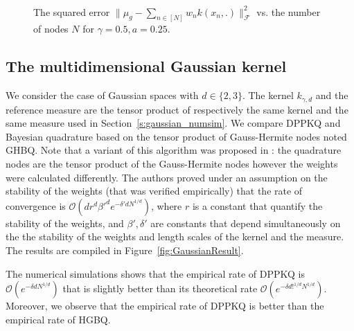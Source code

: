 \documentclass[twoside,11pt]{book}
\numberwithin{theorem}{chapter}
\numberwithin{definition}{chapter}
\numberwithin{proposition}{chapter}
\numberwithin{corollary}{chapter}
\numberwithin{example}{chapter}
\numberwithin{lemma}{chapter}
\numberwithin{assumption}{chapter}
\begin{document}
\begin{figure}
\\
\caption{The squared error $\|\mu_{g}-\sum\limits_{n \in [N]} w_{n}k(x_{n},.)\|_{\mathcal{F}}^{2}$ vs. the number of nodes $N$ for $\gamma = 0.5, a = 0.25$.\label{fig:unidim_gaussian_dppkq}}
\end{figure}




\subsection{The multidimensional Gaussian kernel}\label{s:multigaussian_numsim}

We consider the case of Gaussian spaces with $d \in \{2,3\}$. The kernel $k_{\gamma,d}$ and the reference measure are the tensor product of respectively the same kernel and the same measure used in Section~\ref{s:gaussian_numsim}. We compare DPPKQ and Bayesian quadrature based on the tensor product of Gauss-Hermite nodes noted GHBQ. Note that a variant of this algorithm was proposed in \citep{KaSa19}: the quadrature nodes are the tensor product of the Gauss-Hermite nodes however the weights were calculated differently. The authors proved under an assumption on the stability of the weights (that was verified empirically) that the rate of convergence is $\mathcal{O}(dr^{d}\beta'^{d}e^{-\delta' d N^{1/d}})$, where $r$ is a constant that quantify the stability of the weights, and $\beta',\delta'$ are constants that depend simultaneously on the the stability of the weights and length scales of the kernel and the measure. The results are compiled in Figure~\ref{fig:GaussianResult}.

The numerical simulations shows that the empirical rate of DPPKQ is $\mathcal{O}(e^{-\delta d N^{1/d}})$ that is slightly better than its theoretical rate $\mathcal{O}(e^{-\delta d!^{1/d} N^{1/d}})$. Moreover, we observe that the empirical rate of DPPKQ is better than the empirical rate of HGBQ.
\end{document}
